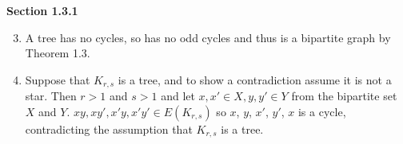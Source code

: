\documentclass[11pt]{article}
\begin{document}
{\bfseries Section 1.3.1}

\begin{enumerate}[1]
    \setcounter{enumi}{2}
    \item
        A tree has no cycles, so has no odd cycles and thus is a bipartite graph by
        Theorem 1.3. 
    \item
        Suppose that $K_{r,s}$ is a tree, and to show a contradiction assume 
        it is not a star. Then $r > 1$ and $s > 1$ and let $x, x' \in X,
        y, y' \in Y$ from the bipartite set $X$ and $Y$. $xy, xy', x'y, x'y' 
        \in E(K_{r,s})$ so $x$, $y$, $x'$, $y'$, $x$ is a cycle, contradicting 
        the assumption that $K_{r,s}$ is a tree. 
\end{enumerate}
\end{document}
